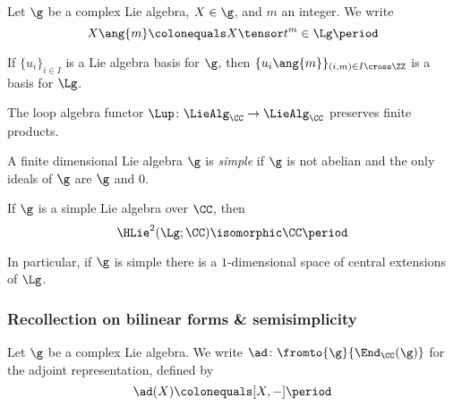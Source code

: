 \begin{notation}
	Let $ \g $ be a complex Lie algebra, $ X \in \g $, and $ m $ an integer. 
	We write 
	\begin{equation*}
		X\ang{m} \colonequals X \tensor t^m \in \Lg \period
	\end{equation*}
\end{notation}

\begin{nul}
	If $ \{u_i\}_{i \in I} $ is a Lie algebra basis for $ \g $, then $ \{u_i\ang{m} \}_{(i,m) \in I \cross \ZZ} $ is a basis for $ \Lg $.
\end{nul}

\begin{remark}\label{remark:prodloopalg}
	The loop algebra functor $ \Lup \colon \LieAlg_{\CC} \to \LieAlg_{\CC} $ preserves finite products.
\end{remark}

\begin{recollection}
	A finite dimensional Lie algebra $ \g $ is \textit{simple} if $ \g $ is not abelian and the only ideals of $ \g
	$ are $ \g $ and $ 0 $.
\end{recollection}

\begin{theorem}
	If $ \g $ is a simple Lie algebra over $ \CC $, then
	\begin{equation*}
		\HLie^2(\Lg;\CC) \isomorphic \CC \period 
	\end{equation*}
\end{theorem}

In particular, if $ \g $ is simple there is a $ 1 $-dimensional space of central extensions of $ \Lg $.


\subsubsection{Recollection on bilinear forms \& semisimplicity}\label{subsec:recbilin}

\begin{notation}
	Let $ \g $ be a complex Lie algebra.
	We write $ \ad \colon \fromto{\g}{\End_{\CC}(\g)} $ for the adjoint representation, defined
	by
	\begin{equation*}
		\ad(X) \colonequals [X,-] \period
	\end{equation*}
\end{notation}

